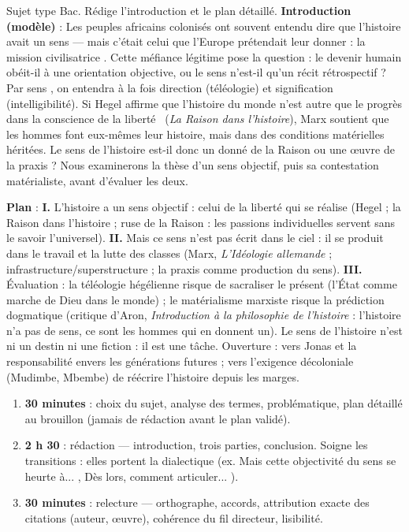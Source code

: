 \documentclass[11pt]{article}
\newcounter{popsec}
\newcounter{popsub}
\newcommand{\courssub}[1]{%
  \stepcounter{popsub}%
  \par\vspace{9pt}\noindent{\popxbold\fontsize{11.5}{13}\selectfont\color{popink}{\color{poporange}\thepopsec.\thepopsub}\hspace{6pt}#1}\par\nopagebreak\vspace{4pt}
}
\begin{document}
\begin{exoresolu}
Sujet type Bac. Rédige l'introduction et le plan détaillé.
\tcblower
\textbf{Introduction (modèle)} : Les peuples africains colonisés ont souvent entendu dire que l'histoire avait un sens — mais c'était celui que l'Europe prétendait leur donner : la \guillemotleft mission civilisatrice \guillemotright. Cette méfiance légitime pose la question : le devenir humain obéit-il à une orientation objective, ou le sens n'est-il qu'un récit rétrospectif ? Par \guillemotleft sens \guillemotright, on entendra à la fois direction (téléologie) et signification (intelligibilité). Si Hegel affirme que \guillemotleft l'histoire du monde n'est autre que le progrès dans la conscience de la liberté \guillemotright\ (\emph{La Raison dans l'histoire}), Marx soutient que les hommes font eux-mêmes leur histoire, mais dans des conditions matérielles héritées. Le sens de l'histoire est-il donc un donné de la Raison ou une œuvre de la praxis ? Nous examinerons la thèse d'un sens objectif, puis sa contestation matérialiste, avant d'évaluer les deux.

\textbf{Plan} :
\textbf{I.} L'histoire a un sens objectif : celui de la liberté qui se réalise (Hegel ; la Raison dans l'histoire ; ruse de la Raison : les passions individuelles servent sans le savoir l'universel).
\textbf{II.} Mais ce sens n'est pas écrit dans le ciel : il se produit dans le travail et la lutte des classes (Marx, \emph{L'Idéologie allemande} ; infrastructure/superstructure ; la praxis comme production du sens).
\textbf{III.} Évaluation : la téléologie hégélienne risque de sacraliser le présent (l'État comme marche de Dieu dans le monde) ; le matérialisme marxiste risque la prédiction dogmatique (critique d'Aron, \emph{Introduction à la philosophie de l'histoire} : l'histoire n'a pas de sens, ce sont les hommes qui en donnent un). Le sens de l'histoire n'est ni un destin ni une fiction : il est une tâche. Ouverture : vers Jonas et la responsabilité envers les générations futures ; vers l'exigence décoloniale (Mudimbe, Mbembe) de réécrire l'histoire depuis les marges.
\end{exoresolu}

\courssub{Gérer l'épreuve : temps, outils, critères}

\begin{methode}
\begin{enumerate}
\item \textbf{30 minutes} : choix du sujet, analyse des termes, problématique, plan détaillé au brouillon (jamais de rédaction avant le plan validé).
\item \textbf{2 h 30} : rédaction — introduction, trois parties, conclusion. Soigne les transitions : elles portent la dialectique (ex. \guillemotleft Mais cette objectivité du sens se heurte à... \guillemotright, \guillemotleft Dès lors, comment articuler... \guillemotright).
\item \textbf{30 minutes} : relecture — orthographe, accords, attribution exacte des citations (auteur, œuvre), cohérence du fil directeur, lisibilité.
\end{enumerate}
\end{methode}
\end{document}
